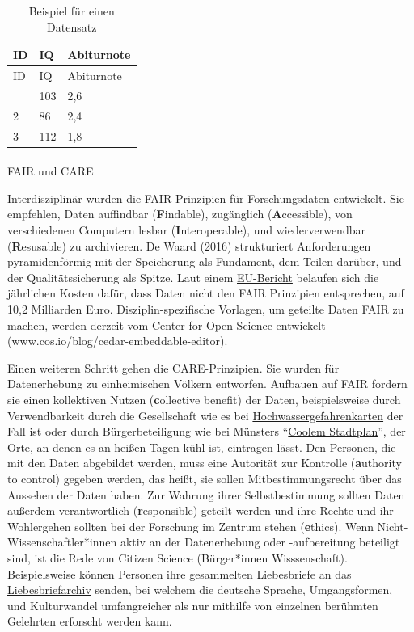 \documentclass[
  letterpaper,
  DIV=11,
  numbers=noendperiod]{scrreprt}
\makeatletter
\let\oldparagraph\paragraph
\renewcommand{\paragraph}{
    \@ifstar
      \xxxParagraphStar
      \xxxParagraphNoStar
  }
\newcommand{\xxxParagraphStar}[1]{\oldparagraph*{#1}\mbox{}}
\newcommand{\xxxParagraphNoStar}[1]{\oldparagraph{#1}\mbox{}}
\makeatother
\begin{document}
\begin{longtable}[]{@{}lll@{}}
\caption{Beispiel für einen Datensatz}\tabularnewline
\toprule\noalign{}
ID & IQ & Abiturnote \\
\midrule\noalign{}
\endfirsthead
\toprule\noalign{}
ID & IQ & Abiturnote \\
\midrule\noalign{}
\endhead
\bottomrule\noalign{}
\endlastfoot
1 & 103 & 2,6 \\
2 & 86 & 2,4 \\
3 & 112 & 1,8 \\
\end{longtable}

\paragraph{FAIR und CARE}\label{fair-und-care}

Interdisziplinär wurden die FAIR Prinzipien für Forschungsdaten
entwickelt. Sie empfehlen, Daten auffindbar (\textbf{F}indable),
zugänglich (\textbf{A}ccessible), von verschiedenen Computern lesbar
(\textbf{I}nteroperable), und wiederverwendbar (\textbf{R}esusable) zu
archivieren. De Waard (2016) strukturiert Anforderungen pyramidenförmig
mit der Speicherung als Fundament, dem Teilen darüber, und der
Qualitätssicherung als Spitze. Laut einem
\href{https://publications.europa.eu/resource/cellar/d375368c-1a0a-11e9-8d04-01aa75ed71a1.0001.01/DOC_1}{EU-Bericht}
belaufen sich die jährlichen Kosten dafür, dass Daten nicht den FAIR
Prinzipien entsprechen, auf 10,2 Milliarden Euro. Disziplin-spezifische
Vorlagen, um geteilte Daten FAIR zu machen, werden derzeit vom Center
for Open Science entwickelt (www.cos.io/blog/cedar-embeddable-editor).

Einen weiteren Schritt gehen die CARE-Prinzipien. Sie wurden für
Datenerhebung zu einheimischen Völkern entworfen. Aufbauen auf FAIR
fordern sie einen kollektiven Nutzen (\textbf{c}ollective benefit) der
Daten, beispielsweise durch Verwendbarkeit durch die Gesellschaft wie es
bei
\href{https://www.flussgebiete.nrw.de/hochwassergefahrenkarten-und-hochwasserrisikokarten}{Hochwassergefahrenkarten}
der Fall ist oder durch Bürgerbeteiligung wie bei Münsters
``\href{https://beteiligung.nrw.de/portal/muenster/beteiligung/themen/1004355/1007106/1048392}{Coolem
Stadtplan}'', der Orte, an denen es an heißen Tagen kühl ist, eintragen
lässt. Den Personen, die mit den Daten abgebildet werden, muss eine
Autorität zur Kontrolle (\textbf{a}uthority to control) gegeben werden,
das heißt, sie sollen Mitbestimmungsrecht über das Aussehen der Daten
haben. Zur Wahrung ihrer Selbstbestimmung sollten Daten außerdem
verantwortlich (\textbf{r}esponsible) geteilt werden und ihre Rechte und
ihr Wohlergehen sollten bei der Forschung im Zentrum stehen
(\textbf{e}thics). Wenn Nicht-Wissenschaftler*innen aktiv an der
Datenerhebung oder -aufbereitung beteiligt sind, ist die Rede von
Citizen Science (Bürger*innen Wisssenschaft). Beispielsweise können
Personen ihre gesammelten Liebesbriefe an das
\href{https://liebesbriefarchiv.de}{Liebesbriefarchiv} senden, bei
welchem die deutsche Sprache, Umgangsformen, und Kulturwandel
umfangreicher als nur mithilfe von einzelnen berühmten Gelehrten
erforscht werden kann.
\end{document}
